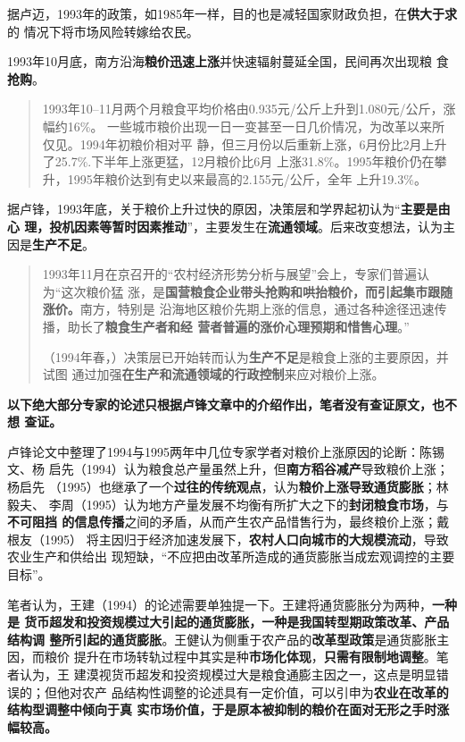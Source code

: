 据卢迈，1993年的政策，如1985年一样，目的也是减轻国家财政负担，在\textbf{供大于求}的
情况下将市场风险转嫁给农民。\cite{lumaisg}

1993年10月底，南方沿海\textbf{粮价迅速上涨}并快速辐射蔓延全国，民间再次出现粮
食\textbf{抢购}。
\begin{quotation}
  1993年10--11月两个月粮食平均价格由0.935元/公斤上升到1.080元/公斤，涨幅约16\%。
  一些城市粮价出现一日一变甚至一日几价情况，为改革以来所仅见。1994年初粮价相对平
  静，但三月份以后重新上涨，6月份比2月上升了25.7\%.下半年上涨更猛，12月粮价比6月
  上涨31.8\%。1995年粮价仍在攀升，1995年粮价达到有史以来最高的2.155元/公斤，全年
  上升19.3\%。\cite{lufengsanci}
\end{quotation}

据卢锋，1993年底，关于粮价上升过快的原因，决策层和学界起初认为“\textbf{主要是由心
  理，投机因素等暂时因素推动}”，主要发生在\textbf{流通领域}。后来改变想法，认为主
因是\textbf{生产不足}。
\begin{quotation}
  1993年11月在京召开的“农村经济形势分析与展望”会上，专家们普遍认为“这次粮价猛
  涨，是\textbf{国营粮食企业带头抢购和哄抬粮价，而引起集市跟随涨价。}南方，特别是
  沿海地区粮价先期上涨的信息，通过各种途径迅速传播，助长了\textbf{粮食生产者和经
    营者普遍的涨价心理预期和惜售心理}。”

  （1994年春，）决策层已开始转而认为\textbf{生产不足}是粮食上涨的主要原因，并试图
  通过加强\textbf{在生产和流通领域的行政控制}来应对粮价上涨。
\end{quotation}

\textbf{以下绝大部分专家的论述只根据卢锋文章中的介绍作出，笔者没有查证原文，也不想
  查证。}

卢锋论文中整理了1994与1995两年中几位专家学者对粮价上涨原因的论断：陈锡文、杨
启先（1994）认为粮食总产量虽然上升，但\textbf{南方稻谷减产}导致粮价上涨；杨启先
（1995）也继承了一个\textbf{过往的传统观点}，认为\textbf{粮价上涨导致通货膨胀}；林毅夫、
李周（1995）认为地方产量发展不均衡有所扩大之下的\textbf{封闭粮食市场}，与\textbf{不可阻挡
  的信息传播}之间的矛盾，从而产生农产品惜售行为，最终粮价上涨；戴根友（1995）
将主因归于经济加速发展下，\textbf{农村人口向城市的大规模流动}，导致农业生产和供给出
现短缺，“不应把由改革所造成的通货膨胀当成宏观调控的主要目标”。

笔者认为，王建（1994）的论述需要单独提一下。王建将通货膨胀分为两种，\textbf{一种是
  货币超发和投资规模过大引起的通货膨胀，一种是我国转型期政策改革、产品结构调
  整所引起的通货膨胀}。王健认为侧重于农产品的\textbf{改革型政策}是通货膨胀主因，而粮价
提升在市场转轨过程中其实是种\textbf{市场化体现}，\textbf{只需有限制地调整}。笔者认为，王
建漠视货币超发和投资规模过大是粮食通膨主因之一，这点是明显错误的；但他对农产
品结构性调整的论述具有一定价值，可以引申为\textbf{农业在改革的结构型调整中倾向于真
  实市场价值，于是原本被抑制的粮价在面对无形之手时涨幅较高。}


